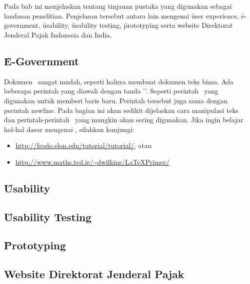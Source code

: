 \chapter{\babDua}
Pada bab ini menjelaskan tentang tinjauan pustaka yang digunakan sebagai landasan penelitian.
Penjelasan tersebut antara lain mengenai \f{user experience}, \f{e-government},
\f{usability}, \f{usability testing}, \f{prototyping} serta website Direktorat Jenderal Pajak Indonesia dan India.
\section{\f{E-Government}}
Dokumen \latex~sangat mudah, seperti halnya membuat dokumen teks biasa. Ada beberapa perintah yang diawali dengan tanda '\bslash'. Seperti perintah \bslash\bslash~yang digunakan untuk memberi baris baru. 
Perintah tersebut juga sama dengan perintah \bslash newline. Pada bagian ini akan sedikit dijelaskan cara manipulasi teks dan perintah-perintah \latex~yang mungkin akan sering digunakan. 
Jika ingin belajar hal-hal dasar mengenai \latex, silahkan kunjungi: 
\begin{itemize}
	\item \url{http://frodo.elon.edu/tutorial/tutorial/}, atau
	\item \url{http://www.maths.tcd.ie/~dwilkins/LaTeXPrimer/}
\end{itemize}
\section{\f{Usability}}
\section{\f{Usability Testing}}
\section{\f{Prototyping}}
\section{Website Direktorat Jenderal Pajak}

